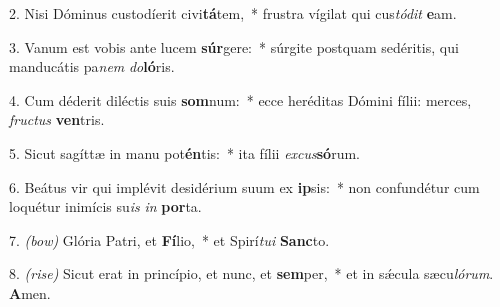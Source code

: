2. Nisi Dóminus custodíerit civi\textbf{tá}tem,~* frustra vígilat qui cus\textit{tó}\textit{dit} \textbf{e}am.

3. Vanum est vobis ante lucem \textbf{súr}gere:~* súrgite postquam sedéritis, qui manducátis pa\textit{nem} \textit{do}\textbf{ló}ris.

4. Cum déderit diléctis suis \textbf{som}num:~* ecce heréditas Dómini fílii: merces, \textit{fruc}\textit{tus} \textbf{ven}tris.

5. Sicut sagíttæ in manu pot\textbf{én}tis:~* ita fílii \textit{ex}\textit{cus}\textbf{só}rum.

6. Beátus vir qui implévit desidérium suum ex \textbf{ip}sis:~* non confundétur cum loquétur inimícis su\textit{is} \textit{in} \textbf{por}ta.

7. {\color{red}\textit{(bow)}} Glória Patri, et \textbf{Fí}lio,~* et Spirí\textit{tu}\textit{i} \textbf{Sanc}to.

8. {\color{red}\textit{(rise)}} Sicut erat in princípio, et nunc, et \textbf{sem}per,~* et in s\'{\ae}cula sæcu\textit{ló}\textit{rum}. \textbf{A}men.